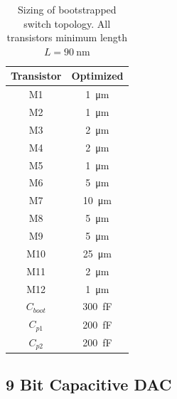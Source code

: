 \documentclass[10pt,journal]{IEEEtran}\usepackage{longtable}
\newcommand{\rowstyle}[1]{\gdef\currentrowstyle{#1}%
  #1\ignorespaces
}
\begin{document}
\begin{table}[hb]
\caption{Sizing of bootstrapped switch topology. All transistors minimum length $L=\SI{90}{\nano\metre}$}
\begin{center}
\begin{tabular}{c|c}
\hline \rowstyle{\bfseries} Transistor & \rowstyle{\bfseries} Optimized  \\ \hline
M1 & \SI{1}{\micro\metre}  \\ \hline
M2 & \SI{1}{\micro\metre}  \\ \hline
M3 & \SI{2}{\micro\metre}  \\ \hline
M4 & \SI{2}{\micro\metre}  \\ \hline
M5 & \SI{1}{\micro\metre}  \\ \hline
M6 & \SI{5}{\micro\metre}  \\ \hline
M7 & \SI{10}{\micro\metre}  \\ \hline
M8 & \SI{5}{\micro\metre}  \\ \hline
M9 & \SI{5}{\micro\metre}  \\ \hline
M10 & \SI{25}{\micro\metre}  \\ \hline
M11 & \SI{2}{\micro\metre}  \\ \hline
M12 & \SI{1}{\micro\metre}  \\ \hline
$C_{boot}$ & \SI{300}{\femto\farad}  \\ \hline
$C_{p1}$ & \SI{200}{\femto\farad}  \\ \hline
$C_{p2}$ & \SI{200}{\femto\farad}  \\ \hline
\end{tabular}
\end{center}
\label{tbl:BootstrappedDesign}
\end{table}




\subsection{9 Bit Capacitive DAC}
\end{document}
